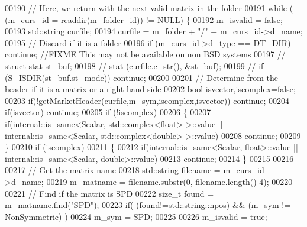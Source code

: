 \begin{DoxyCode}
00190       \textcolor{comment}{// Here, we return with the next valid matrix in the folder}
00191       \textcolor{keywordflow}{while} ( (m\_curs\_id = readdir(m\_folder\_id)) != NULL) \{
00192         m\_isvalid = \textcolor{keyword}{false};
00193         std::string curfile;
00194         curfile = m\_folder + \textcolor{stringliteral}{"/"} + m\_curs\_id->d\_name;
00195         \textcolor{comment}{// Discard if it is a folder}
00196         \textcolor{keywordflow}{if} (m\_curs\_id->d\_type == DT\_DIR) \textcolor{keywordflow}{continue}; \textcolor{comment}{//FIXME This may not be available on non BSD systems}
00197 \textcolor{comment}{//         struct stat st\_buf; }
00198 \textcolor{comment}{//         stat (curfile.c\_str(), &st\_buf);}
00199 \textcolor{comment}{//         if (S\_ISDIR(st\_buf.st\_mode)) continue;}
00200         
00201         \textcolor{comment}{// Determine from the header if it is a matrix or a right hand side }
00202         \textcolor{keywordtype}{bool} isvector,iscomplex=\textcolor{keyword}{false};
00203         \textcolor{keywordflow}{if}(!getMarketHeader(curfile,m\_sym,iscomplex,isvector)) \textcolor{keywordflow}{continue};
00204         \textcolor{keywordflow}{if}(isvector) \textcolor{keywordflow}{continue};
00205         \textcolor{keywordflow}{if} (!iscomplex)
00206         \{
00207           \textcolor{keywordflow}{if}(\hyperlink{struct_eigen_1_1internal_1_1is__same}{internal::is\_same}<Scalar, std::complex<float> >::value || 
      \hyperlink{struct_eigen_1_1internal_1_1is__same}{internal::is\_same}<Scalar, std::complex<double> >::value)
00208             \textcolor{keywordflow}{continue}; 
00209         \}
00210         \textcolor{keywordflow}{if} (iscomplex)
00211         \{
00212           \textcolor{keywordflow}{if}(\hyperlink{struct_eigen_1_1internal_1_1is__same}{internal::is\_same<Scalar, float>::value} || 
      \hyperlink{struct_eigen_1_1internal_1_1is__same}{internal::is\_same<Scalar, double>::value})
00213             \textcolor{keywordflow}{continue}; 
00214         \}
00215         
00216         
00217         \textcolor{comment}{// Get the matrix name}
00218         std::string filename = m\_curs\_id->d\_name;
00219         m\_matname = filename.substr(0, filename.length()-4); 
00220         
00221         \textcolor{comment}{// Find if the matrix is SPD }
00222         \textcolor{keywordtype}{size\_t} found = m\_matname.find(\textcolor{stringliteral}{"SPD"});
00223         \textcolor{keywordflow}{if}( (found!=std::string::npos) && (m\_sym != NonSymmetric) )
00224           m\_sym = SPD;
00225        
00226         m\_isvalid = \textcolor{keyword}{true};

\end{DoxyCode}
